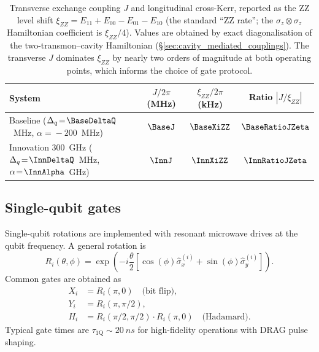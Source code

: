 \begin{table}[htbp]
\centering
\small
\begin{tabularx}{\linewidth}{@{}L c c c@{}}
\toprule
System & $J/2\pi$ (MHz) & $\xi_{ZZ}/2\pi$ (kHz) & Ratio $|J/\xi_{ZZ}|$ \\
\midrule
Baseline ($\Delta_q\!=\!\BaseDeltaQ$~MHz, $\alpha\!=\!-200$~MHz)        & $\BaseJ$ & $\BaseXiZZ$ & $\BaseRatioJZeta$  \\
Innovation 300~GHz ($\Delta_q\!=\!\InnDeltaQ$~MHz, $\alpha\!=\!\InnAlpha$~GHz) & $\InnJ$ & $\InnXiZZ$  & $\InnRatioJZeta$ \\
\bottomrule
\end{tabularx}
\caption{Transverse exchange coupling $J$ and longitudinal cross-Kerr,
reported as the ZZ level shift $\xi_{ZZ}=E_{11}+E_{00}-E_{01}-E_{10}$
(the standard ``ZZ rate''; the $\sigma_z\!\otimes\!\sigma_z$ Hamiltonian
coefficient is $\xi_{ZZ}/4$). Values are obtained by exact diagonalisation of
the two-transmon--cavity Hamiltonian (\S\ref{sec:cavity_mediated_couplings}).
The transverse $J$ dominates $\xi_{ZZ}$ by nearly two orders of magnitude at
both operating points, which informs the choice of gate protocol.}
\label{tab:J_vs_zetazz}
\end{table}




\subsection{Single-qubit gates}
\label{sub:tqb_singleq}

Single-qubit rotations are implemented with resonant microwave drives at the qubit frequency. A general rotation is
\begin{equation}
R_i(\theta, \phi) = \exp\left(-i\frac{\theta}{2}\left[\cos(\phi)\hat{\sigma}_x^{(i)} + \sin(\phi)\hat{\sigma}_y^{(i)}\right]\right).
\end{equation}
Common gates are obtained as
\begin{align}
X_i &= R_i(\pi, 0) \quad \text{(bit flip)}, \\
Y_i &= R_i(\pi, \pi/2), \\
H_i &= R_i(\pi/2, \pi/2) \cdot R_i(\pi, 0) \quad \text{(Hadamard)}.
\end{align}
Typical gate times are $\tau_{\text{1Q}} \sim \SI{20}{ns}$ for high-fidelity operations with DRAG pulse shaping.

